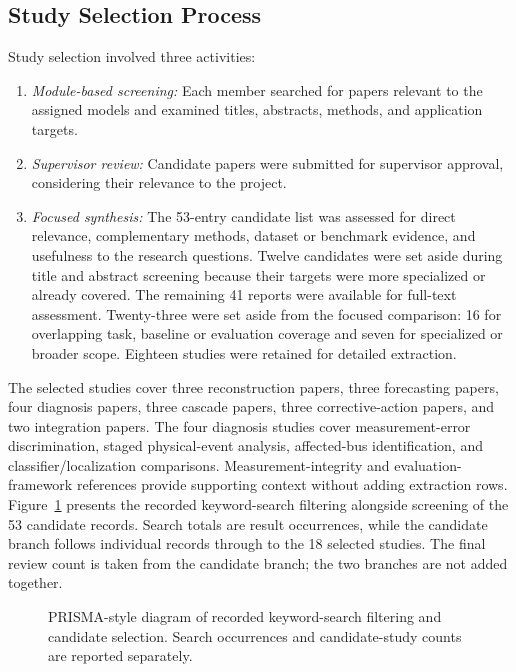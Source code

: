 \documentclass[journal,letterpaper]{IEEEtran}
\begin{document}
\subsection{Study Selection Process}
Study selection involved three activities:
\begin{enumerate}
\item \textit{Module-based screening:} Each member searched for papers relevant to the assigned models and examined titles, abstracts, methods, and application targets.
\item \textit{Supervisor review:} Candidate papers were submitted for supervisor approval, considering their relevance to the project.
\item \textit{Focused synthesis:} The 53-entry candidate list was assessed for direct relevance, complementary methods, dataset or benchmark evidence, and usefulness to the research questions. Twelve candidates were set aside during title and abstract screening because their targets were more specialized or already covered. The remaining 41 reports were available for full-text assessment. Twenty-three were set aside from the focused comparison: 16 for overlapping task, baseline or evaluation coverage and seven for specialized or broader scope. Eighteen studies were retained for detailed extraction.
\end{enumerate}
The selected studies cover three reconstruction papers, three forecasting papers, four diagnosis papers, three cascade papers, three corrective-action papers, and two integration papers. The four diagnosis studies cover measurement-error discrimination, staged physical-event analysis, affected-bus identification, and classifier/localization comparisons. Measurement-integrity and evaluation-framework references provide supporting context without adding extraction rows. Figure~\ref{fig:selection} presents the recorded keyword-search filtering alongside screening of the 53 candidate records. Search totals are result occurrences, while the candidate branch follows individual records through to the 18 selected studies. The final review count is taken from the candidate branch; the two branches are not added together.

\begin{figure}[!t]
\centering

\caption{PRISMA-style diagram of recorded keyword-search filtering and candidate selection. Search occurrences and candidate-study counts are reported separately.}
\label{fig:selection}
\end{figure}
\end{document}
